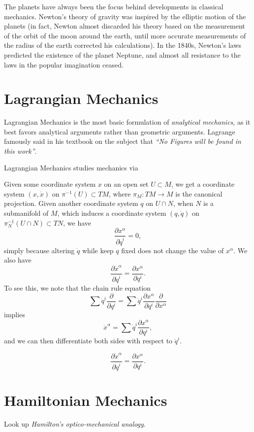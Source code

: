 The planets have always been the focus behind developments in classical mechanics. Newton's theory of gravity was inspired by the elliptic motion of the planets (in fact, Newton almost discarded his theory based on the measurement of the orbit of the moon around the earth, until more accurate measurements of the radius of the earth corrected his calculations). In the 1840s, Newton's laws predicted the existence of the planet Neptune, and almost all resistance to the laws in the popular imagination ceased.












\chapter{Lagrangian Mechanics}

Lagrangian Mechanics is the most basic formulation of \emph{analytical mechanics}, as it best favors analytical arguments rather than geometric arguments. Lagrange famously said in his textbook on the subject that \emph{``No Figures will be found in this work''}.

Lagrangian Mechanics studies mechanics via

Given some coordinate system $x$ on an open set $U \subset M$, we get a coordinate system $(x,\dot{x})$ on $\pi^{-1}(U) \subset TM$, where $\pi_M: TM \to M$ is the canonical projection. Given another coordinate system $q$ on $U \cap N$, when $N$ is a submanifold of $M$, which induces a coordinate system $(q,\dot{q})$ on $\pi_N^{-1}(U \cap N) \subset TN$, we have
%
\[ \frac{\partial x^\alpha}{\partial \dot{q}^i} = 0, \]
%
simply because altering $\dot{q}$ while keep $q$ fixed does not change the value of $x^\alpha$. We also have
%
\[ \frac{\partial \dot{x}^\alpha}{\partial \dot{q}^i} = \frac{\partial x^\alpha}{\partial q^i}. \]
%
To see this, we note that the chain rule equation
%
\[ \sum \dot{q}^i \frac{\partial}{\partial q^i} = \sum \dot{q}^i \frac{\partial x^\alpha}{\partial q^i} \frac{\partial}{\partial x^\alpha} \]
%
implies
%
\[ \dot{x}^\alpha = \sum \dot{q}^i \frac{\partial x^\alpha}{\partial q^i}, \]
%
and we can then differentiate both sides with respect to $\dot{q}^i$.

%
%
%

%
\[ \frac{\partial \dot{x}^\alpha}{\partial \dot{q}^i} = \frac{\partial x^\alpha}{\partial q^i}. \]




\chapter{Hamiltonian Mechanics}

Look up \emph{Hamilton's optico-mechanical analogy}.













